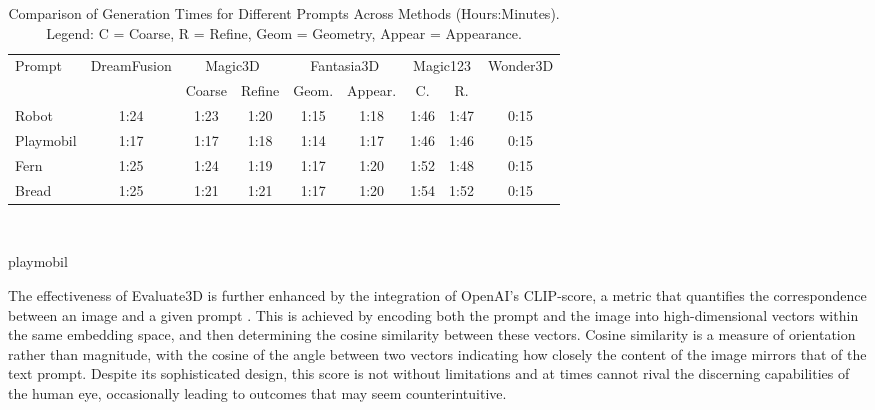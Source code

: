 \begin{table}[ht]
    \centering
    \small 
    \begin{tabular}{lcccccccc}
    \toprule
    Prompt & DreamFusion & \multicolumn{2}{c}{Magic3D} & \multicolumn{2}{c}{Fantasia3D} & \multicolumn{2}{c}{Magic123} & Wonder3D \\
    \cmidrule(r){3-4} \cmidrule(lr){5-6} \cmidrule(l){7-8}
    & & \multicolumn{1}{c}{Coarse} & \multicolumn{1}{c}{Refine} & \multicolumn{1}{c}{Geom.} & \multicolumn{1}{c}{Appear.} & \multicolumn{1}{c}{C.} & \multicolumn{1}{c}{R.} &  \\
    \midrule
    Robot & 1:24 & 1:23 & 1:20 & 1:15 & 1:18 & 1:46 & 1:47 & 0:15 \\
    Playmobil & 1:17 & 1:17 & 1:18 & 1:14 & 1:17 & 1:46 & 1:46 & 0:15 \\
    Fern & 1:25 & 1:24 & 1:19 & 1:17 & 1:20 & 1:52 & 1:48 & 0:15 \\
    Bread & 1:25 & 1:21 & 1:21 & 1:17 & 1:20 & 1:54 & 1:52 & 0:15 \\
    \bottomrule
    \end{tabular}
    \caption{Comparison of Generation Times for Different Prompts Across Methods (Hours:Minutes). Legend: C = Coarse, R = Refine, Geom = Geometry, Appear = Appearance.}~\label{table:generation_times_complex}
\end{table}


playmobil

The effectiveness of Evaluate3D is further enhanced by the integration of OpenAI's CLIP-score, a metric that quantifies the correspondence between an image and a given prompt \citep{radfordCLIP}. This is achieved by encoding both the prompt and the image into high-dimensional vectors within the same embedding space, and then determining the cosine similarity between these vectors. Cosine similarity is a measure of orientation rather than magnitude, with the cosine of the angle between two vectors indicating how closely the content of the image mirrors that of the text prompt. Despite its sophisticated design, this score is not without limitations and at times cannot rival the discerning capabilities of the human eye, occasionally leading to outcomes that may seem counterintuitive.

